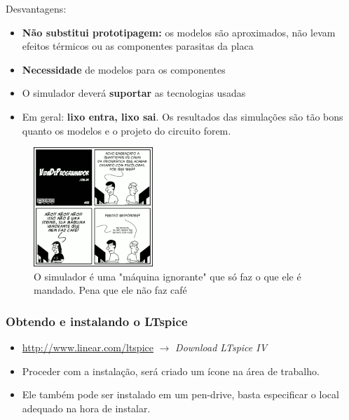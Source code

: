 \documentclass{beamer}
\begin{document}
\begin{frame} %
Desvantagens:
\begin{itemize}
\item{\textbf{Não substitui prototipagem:} os modelos são aproximados, não levam efeitos térmicos ou as componentes parasitas da placa}
\item{\textbf{Necessidade} de modelos para os componentes}
\item{O simulador deverá \textbf{suportar} as tecnologias usadas}
\item{Em geral: \textbf{lixo entra, lixo sai}. Os resultados das simulações são tão bons quanto os modelos e o projeto do circuito forem.}
\end{itemize}
\end{frame}

\begin{frame}

\begin{figure}[htb]
\includegraphics[width=170px]{images/tirinha33}
\caption{O simulador é uma "máquina ignorante" que só faz o que ele é mandado. Pena que ele não faz café}
\label{fig:lixoentrasai}
\end{figure} 

\end{frame} %

\begin{frame} %
\frametitle{Obtendo e instalando o LTspice}
\begin{itemize}
\item \url{http://www.linear.com/ltspice} $\rightarrow$ \textit{Download LTspice IV}
\item Proceder com a instalação, será criado um ícone na área de trabalho.
\item Ele também pode ser instalado em um pen-drive, basta especificar o local adequado na hora de instalar.
\end{itemize}
\end{frame}
\end{document}
